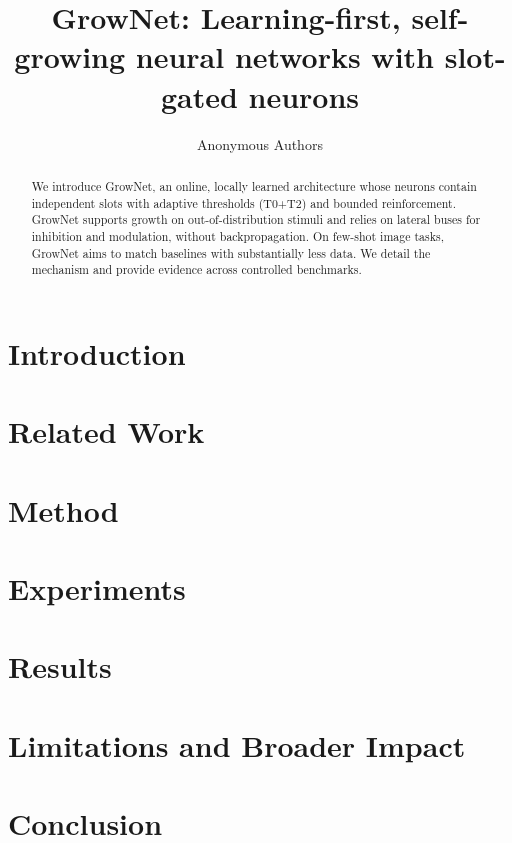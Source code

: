 \documentclass{article}
\title{GrowNet: Learning-first, self-growing neural networks with slot-gated neurons}
\author{Anonymous Authors}
\date{}
\begin{document}
\maketitle

\begin{abstract}
We introduce GrowNet, an online, locally learned architecture whose neurons contain independent slots with adaptive thresholds (T0+T2) and bounded reinforcement. GrowNet supports growth on out-of-distribution stimuli and relies on lateral buses for inhibition and modulation, without backpropagation. On few-shot image tasks, GrowNet aims to match baselines with substantially less data. We detail the mechanism and provide evidence across controlled benchmarks.
\end{abstract}

\section{Introduction}


\section{Related Work}


\section{Method}


\section{Experiments}


\section{Results}


\section{Limitations and Broader Impact}


\section{Conclusion}





\end{document}
